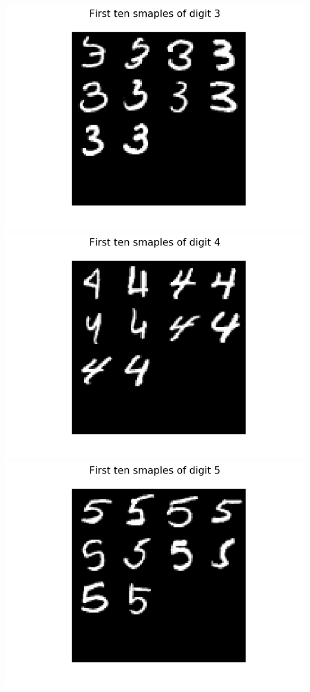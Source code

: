 \documentclass{article}
\begin{document}
\begin{center}
    \includegraphics[trim=3cm 0 0 0, scale=0.4]{images/task1_1_imgs_class3.png}
    \includegraphics[trim=3cm 0 0 0, scale=0.4]{images/task1_1_imgs_class4.png}
    \includegraphics[trim=3cm 0 3cm 0, scale=0.4]{images/task1_1_imgs_class5.png}
\end{center}
\end{document}
